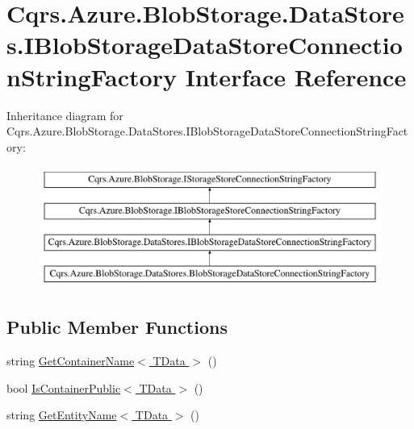 \hypertarget{interfaceCqrs_1_1Azure_1_1BlobStorage_1_1DataStores_1_1IBlobStorageDataStoreConnectionStringFactory}{}\section{Cqrs.\+Azure.\+Blob\+Storage.\+Data\+Stores.\+I\+Blob\+Storage\+Data\+Store\+Connection\+String\+Factory Interface Reference}
\label{interfaceCqrs_1_1Azure_1_1BlobStorage_1_1DataStores_1_1IBlobStorageDataStoreConnectionStringFactory}
Inheritance diagram for Cqrs.\+Azure.\+Blob\+Storage.\+Data\+Stores.\+I\+Blob\+Storage\+Data\+Store\+Connection\+String\+Factory\+:\begin{figure}[H]
\begin{center}
\leavevmode
\includegraphics[height=4.000000cm]{interfaceCqrs_1_1Azure_1_1BlobStorage_1_1DataStores_1_1IBlobStorageDataStoreConnectionStringFactory}
\end{center}
\end{figure}
\subsection*{Public Member Functions}
\begin{DoxyCompactItemize}
\item 
string \hyperlink{interfaceCqrs_1_1Azure_1_1BlobStorage_1_1DataStores_1_1IBlobStorageDataStoreConnectionStringFactory_a7c86fb71e24cd75b848f67e6864689ae_a7c86fb71e24cd75b848f67e6864689ae}{Get\+Container\+Name$<$ T\+Data $>$} ()
\item 
bool \hyperlink{interfaceCqrs_1_1Azure_1_1BlobStorage_1_1DataStores_1_1IBlobStorageDataStoreConnectionStringFactory_a328ddc36412d9d01fed52aeed545c1a4_a328ddc36412d9d01fed52aeed545c1a4}{Is\+Container\+Public$<$ T\+Data $>$} ()
\item 
string \hyperlink{interfaceCqrs_1_1Azure_1_1BlobStorage_1_1DataStores_1_1IBlobStorageDataStoreConnectionStringFactory_ad7f6480ea3fa6dfab0953f05c2c15f85_ad7f6480ea3fa6dfab0953f05c2c15f85}{Get\+Entity\+Name$<$ T\+Data $>$} ()
\end{DoxyCompactItemize}


